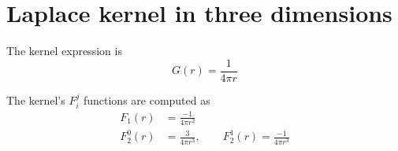 \section{Laplace kernel in three dimensions}

The kernel expression is
%
\begin{equation}
	G(r) = \frac{1}{4\pi r}
\end{equation}
%

The kernel's $F_i^j$ functions are computed as
%
\begin{align}
	F_1(r) &= \frac{-1}{4\pi r^2} \\
	F_2^0(r) &= \frac{3}{4\pi r^3}, \qquad F_2^1(r) = \frac{-1}{4\pi r^3}
\end{align}

